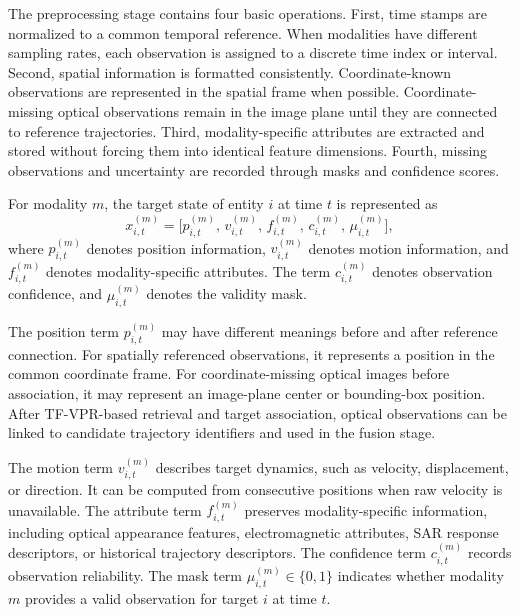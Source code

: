 The preprocessing stage contains four basic operations. First, time stamps are normalized to a common temporal reference. When modalities have different sampling rates, each observation is assigned to a discrete time index or interval. Second, spatial information is formatted consistently. Coordinate-known observations are represented in the spatial frame when possible. Coordinate-missing optical observations remain in the image plane until they are connected to reference trajectories. Third, modality-specific attributes are extracted and stored without forcing them into identical feature dimensions. Fourth, missing observations and uncertainty are recorded through masks and confidence scores.

For modality \(m\), the target state of entity \(i\) at time \(t\) is represented as
\begin{equation}
  x_{i,t}^{(m)}
  =
  \big[
  p_{i,t}^{(m)},\,
  v_{i,t}^{(m)},\,
  f_{i,t}^{(m)},\,
  c_{i,t}^{(m)},\,
  \mu_{i,t}^{(m)}
  \big],
  \label{eq:chapter2-target-state}
\end{equation}
where \(p_{i,t}^{(m)}\) denotes position information, \(v_{i,t}^{(m)}\) denotes motion information, and \(f_{i,t}^{(m)}\) denotes modality-specific attributes. The term \(c_{i,t}^{(m)}\) denotes observation confidence, and \(\mu_{i,t}^{(m)}\) denotes the validity mask.

The position term \(p_{i,t}^{(m)}\) may have different meanings before and after reference connection. For spatially referenced observations, it represents a position in the common coordinate frame. For coordinate-missing optical images before association, it may represent an image-plane center or bounding-box position. After TF-VPR-based retrieval and target association, optical observations can be linked to candidate trajectory identifiers and used in the fusion stage.

The motion term \(v_{i,t}^{(m)}\) describes target dynamics, such as velocity, displacement, or direction. It can be computed from consecutive positions when raw velocity is unavailable. The attribute term \(f_{i,t}^{(m)}\) preserves modality-specific information, including optical appearance features, electromagnetic attributes, SAR response descriptors, or historical trajectory descriptors. The confidence term \(c_{i,t}^{(m)}\) records observation reliability. The mask term \(\mu_{i,t}^{(m)}\in\{0,1\}\) indicates whether modality \(m\) provides a valid observation for target \(i\) at time \(t\).

